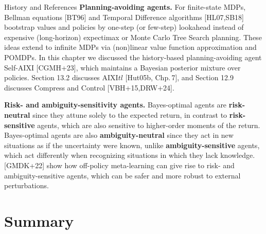 \documentclass[aspectratio=169,10pt]{beamer}
\begin{document}
\begin{frame}[allowframebreaks]{History and References}
  \vspace{0.3em}
  \textbf{Planning-avoiding agents.} For finite-state MDPs, Bellman
  equations [BT96] and Temporal Difference algorithms [HL07,SB18]
  bootstrap values and policies by one-step (or few-step) lookahead
  instead of expensive (long-horizon) expectimax or Monte Carlo Tree
  Search planning. These ideas extend to infinite MDPs via (non)linear
  value function approximation and POMDPs. In this chapter we discussed
  the history-based planning-avoiding agent Self-AIXI [CGMH+23], which
  maintains a Bayesian posterior mixture over policies. Section 13.2
  discusses AIXI$tl$ [Hut05b, Chp.\,7], and Section 12.9 discusses
  Compress and Control [VBH+15,DRW+24].

  \framebreak
  \textbf{Risk- and ambiguity-sensitivity agents.} Bayes-optimal agents are
  \textbf{risk-neutral} since they attune solely to the expected return, in
  contrast to \textbf{risk-sensitive} agents, which are also sensitive to
  higher-order moments of the return. Bayes-optimal agents are also
  \textbf{ambiguity-neutral} since they act in new situations as if the
  uncertainty were known, unlike \textbf{ambiguity-sensitive} agents, which
  act differently when recognizing situations in which they lack
  knowledge. [GMDK+22] show how off-policy meta-learning can give rise to
  risk- and ambiguity-sensitive agents, which can be safer and more robust
  to external perturbations.
\end{frame}

\section{Summary}
\end{document}
